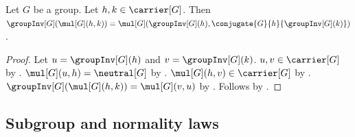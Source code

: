 \begin{lemma}\label{subgroup_product_inverse_rearrangement}
    Let $G$ be a group.
    Let $h,k\in\carrier[G]$.
    Then
        $\groupInv[G](\mul[G](h,k))=
            \mul[G]
                (\groupInv[G](h),
                 \conjugate{G}{h}{\groupInv[G](k)})$.
\end{lemma}
\begin{proof}
    Let $u=\groupInv[G](h)$ and $v=\groupInv[G](k)$.
    $u,v\in\carrier[G]$ by .
    $\mul[G](u,h)=\neutral[G]$ by .
    $\mul[G](h,v)\in\carrier[G]$ by
        .
    $\groupInv[G](\mul[G](h,k))=\mul[G](v,u)$ by
        .
    Follows by
        .
\end{proof}

\subsection{Subgroup and normality laws}

